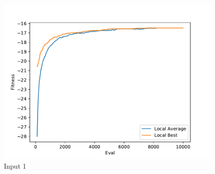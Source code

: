 \documentclass{standalone}
\begin{document}
\begin{figure}[!htb]
	\caption{Input 1}
	\label{fig:graph_1011}
	\includegraphics[width=\textwidth]{../graphs/graphs/1011.pdf}
\end{figure}
\end{document}
